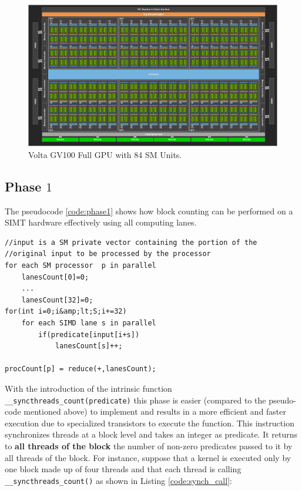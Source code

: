 \begin{figure}
	\begin{center}
		\includegraphics[width=1.0\textwidth]{./images/stream_compaction/volta_architecture}
		\caption{ Volta GV100 Full GPU with 84 SM Units.}
		\label{fig:volta_architecture}
	\end{center}
\end{figure}

\subsection{Phase $1$}
The  pseudocode \ref{code:phase1} shows how block counting can be performed on a SIMT hardware effectively using all computing lanes.
\begin{lstlisting}
//input is a SM private vector containing the portion of the //original input to be processed by the processor
for each SM processor  p in parallel
	lanesCount[0]=0;
	...
	lanesCount[32]=0;
for(int i=0;i&amp;lt;S;i+=32)
	for each SIMD lane s in parallel
		if(predicate[input[i+s])
			lanesCount[s]++;

procCount[p] = reduce(+,lanesCount);	
\end{lstlisting}

With the introduction of the intrinsic function \texttt{\_\_syncthreads\_count(predicate)} this phase is easier (compared to the pseudo-code mentioned above) to implement and results in a more efficient and faster execution due to specialized transistors to execute the function. This instruction synchronizes threads at a block level and takes an integer as predicate. It returns to \textbf{all threads of the block} the number of non-zero predicates passed to it by all threads of the block.
For instance, suppose that a kernel is executed only by one block made up of four threads and that each thread is calling \texttt{\_\_syncthreads\_count()} as shown in Listing \ref{code:synch_call}:


